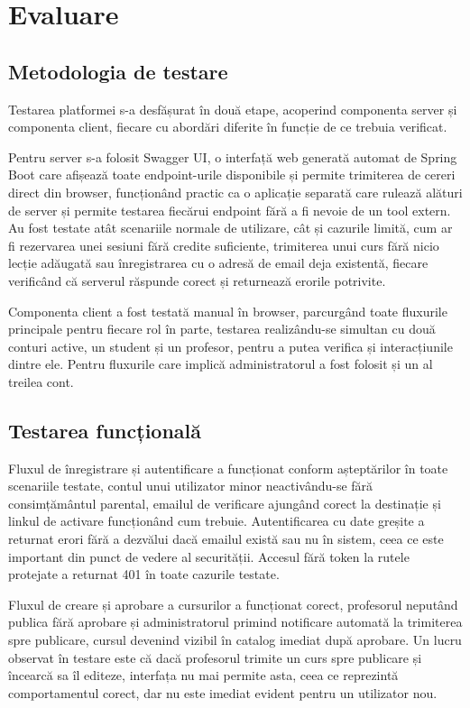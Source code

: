 \chapter{Evaluare} 

\section{Metodologia de testare}
Testarea platformei s-a desfășurat în două etape, acoperind componenta server și componenta client, fiecare cu abordări diferite în funcție de ce trebuia verificat.

Pentru server s-a folosit Swagger UI, o interfață web generată automat de Spring Boot care afișează toate endpoint-urile disponibile și permite trimiterea de cereri direct din browser, funcționând practic ca o aplicație separată care rulează alături de server și permite testarea fiecărui endpoint fără a fi nevoie de un tool extern. Au fost testate atât scenariile normale de utilizare, cât și cazurile limită, cum ar fi rezervarea unei sesiuni fără credite suficiente, trimiterea unui curs fără nicio lecție adăugată sau înregistrarea cu o adresă de email deja existentă, fiecare verificând că serverul răspunde corect și returnează erorile potrivite.

Componenta client a fost testată manual în browser, parcurgând toate fluxurile principale pentru fiecare rol în parte, testarea realizându-se simultan cu două conturi active, un student și un profesor, pentru a putea verifica și interacțiunile dintre ele. Pentru fluxurile care implică administratorul a fost folosit și un al treilea cont.

\section{Testarea funcțională}
Fluxul de înregistrare și autentificare a funcționat conform așteptărilor în toate scenariile testate, contul unui utilizator minor neactivându-se fără consimțământul parental, emailul de verificare ajungând corect la destinație și linkul de activare funcționând cum trebuie. Autentificarea cu date greșite a returnat erori fără a dezvălui dacă emailul există sau nu în sistem, ceea ce este important din punct de vedere al securității. Accesul fără token la rutele protejate a returnat 401 în toate cazurile testate.

Fluxul de creare și aprobare a cursurilor a funcționat corect, profesorul neputând publica fără aprobare și administratorul primind notificare automată la trimiterea spre publicare, cursul devenind vizibil în catalog imediat după aprobare. Un lucru observat în testare este că dacă profesorul trimite un curs spre publicare și încearcă sa îl editeze, interfața nu mai permite asta, ceea ce reprezintă comportamentul corect, dar nu este imediat evident pentru un utilizator nou.

